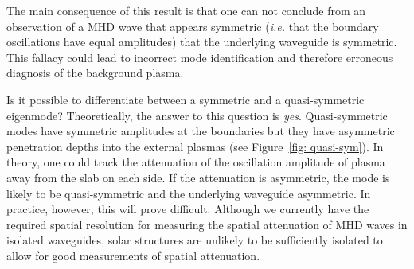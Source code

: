 The main consequence of this result is that one can not conclude from an observation of a MHD wave that appears symmetric (\textit{i.e.} that the boundary oscillations have equal amplitudes) that the underlying waveguide is symmetric. This fallacy could lead to incorrect mode identification and therefore erroneous diagnosis of the background plasma.

Is it possible to differentiate between a symmetric and a quasi-symmetric eigenmode? Theoretically, the answer to this question is \textit{yes}. Quasi-symmetric modes have symmetric amplitudes at the boundaries but they have asymmetric penetration depths into the external plasmas (see Figure~\ref{fig: quasi-sym}). In theory, one could track the attenuation of the oscillation amplitude of plasma away from the slab on each side. If the attenuation is asymmetric, the mode is likely to be quasi-symmetric and the underlying waveguide asymmetric. In practice, however, this will prove difficult. Although we currently have the required spatial resolution for measuring the spatial attenuation of MHD waves in isolated waveguides, solar structures are unlikely to be sufficiently isolated to allow for good measurements of spatial attenuation.


